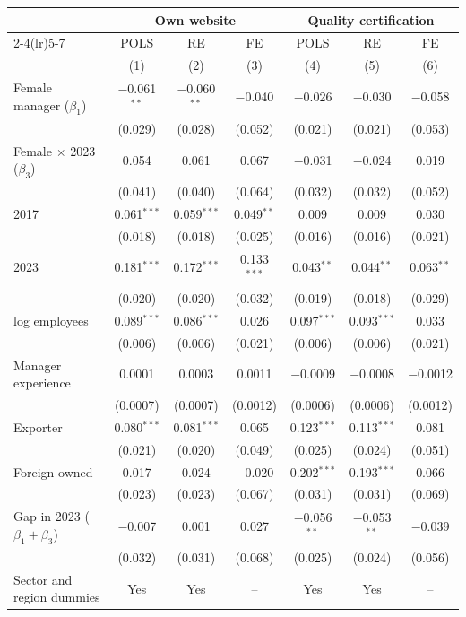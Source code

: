 \begin{tabular}{lcccccc}
\toprule
 & \multicolumn{3}{c}{Own website} & \multicolumn{3}{c}{Quality certification} \\
\cmidrule(lr){2-4}\cmidrule(lr){5-7}
 & POLS & RE & FE & POLS & RE & FE \\
 & (1) & (2) & (3) & (4) & (5) & (6) \\
\midrule
Female manager ($\beta_1$) & $-$0.061$^{**}$ & $-$0.060$^{**}$ & $-$0.040 & $-$0.026 & $-$0.030 & $-$0.058 \\
 & (0.029) & (0.028) & (0.052) & (0.021) & (0.021) & (0.053) \\
Female $\times$ 2023 ($\beta_3$) & 0.054 & 0.061 & 0.067 & $-$0.031 & $-$0.024 & 0.019 \\
 & (0.041) & (0.040) & (0.064) & (0.032) & (0.032) & (0.052) \\
2017 & 0.061$^{***}$ & 0.059$^{***}$ & 0.049$^{**}$ & 0.009 & 0.009 & 0.030 \\
 & (0.018) & (0.018) & (0.025) & (0.016) & (0.016) & (0.021) \\
2023 & 0.181$^{***}$ & 0.172$^{***}$ & 0.133$^{***}$ & 0.043$^{**}$ & 0.044$^{**}$ & 0.063$^{**}$ \\
 & (0.020) & (0.020) & (0.032) & (0.019) & (0.018) & (0.029) \\
log employees & 0.089$^{***}$ & 0.086$^{***}$ & 0.026 & 0.097$^{***}$ & 0.093$^{***}$ & 0.033 \\
 & (0.006) & (0.006) & (0.021) & (0.006) & (0.006) & (0.021) \\
Manager experience & 0.0001 & 0.0003 & 0.0011 & $-$0.0009 & $-$0.0008 & $-$0.0012 \\
 & (0.0007) & (0.0007) & (0.0012) & (0.0006) & (0.0006) & (0.0012) \\
Exporter & 0.080$^{***}$ & 0.081$^{***}$ & 0.065 & 0.123$^{***}$ & 0.113$^{***}$ & 0.081 \\
 & (0.021) & (0.020) & (0.049) & (0.025) & (0.024) & (0.051) \\
Foreign owned & 0.017 & 0.024 & $-$0.020 & 0.202$^{***}$ & 0.193$^{***}$ & 0.066 \\
 & (0.023) & (0.023) & (0.067) & (0.031) & (0.031) & (0.069) \\
Gap in 2023 ($\beta_1+\beta_3$) & $-$0.007 & 0.001 & 0.027 & $-$0.056$^{**}$ & $-$0.053$^{**}$ & $-$0.039 \\
 & (0.032) & (0.031) & (0.068) & (0.025) & (0.024) & (0.056) \\
\midrule
Sector and region dummies & Yes & Yes & -- & Yes & Yes & -- \\

\end{tabular}
